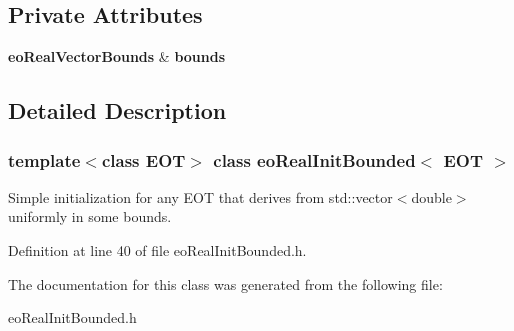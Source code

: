 \subsection*{Private Attributes}
\begin{CompactItemize}
\item 
{\bf eo\-Real\-Vector\-Bounds} \& {\bf bounds}\label{classeo_real_init_bounded_r0}

\end{CompactItemize}


\subsection{Detailed Description}
\subsubsection*{template$<$class EOT$>$ class eo\-Real\-Init\-Bounded$<$ EOT $>$}

Simple initialization for any EOT that derives from std::vector$<$double$>$ uniformly in some bounds. 



Definition at line 40 of file eo\-Real\-Init\-Bounded.h.

The documentation for this class was generated from the following file:\begin{CompactItemize}
\item 
eo\-Real\-Init\-Bounded.h\end{CompactItemize}
